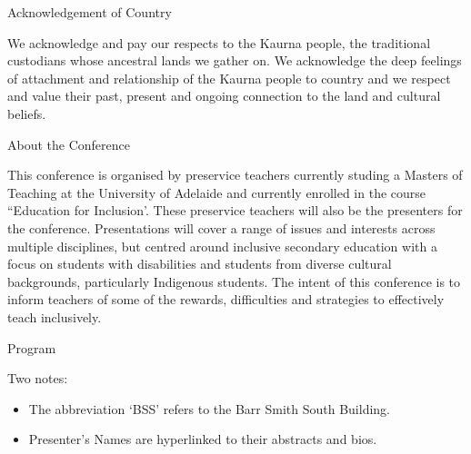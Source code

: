 \documentclass[twoside,14pt,a4paper,notitlepage]{memoir}
\newcounter{chapternonum}
\begin{document}
\pagestyle{plain}



\setcounter{tocdepth}{2}
\tableofcontents
\vfill

\clearpage{}
\vspace*{2cm}
{\Huge Acknowledgement of Country}
\vspace{2cm}

We acknowledge and pay our respects to the Kaurna people, the traditional custodians whose ancestral lands we gather on. We acknowledge the deep feelings of attachment and relationship of the Kaurna people to country and we respect and value their past, present and ongoing connection to the land and cultural beliefs.
\vfill

\clearpage{}
\vspace*{2cm}
{\Huge About the Conference}
\vspace{2cm}

This conference is organised by preservice teachers currently studing a Masters of Teaching at the University of Adelaide and currently enrolled in the course ``Education for Inclusion'. These preservice teachers will also be the presenters for the conference. Presentations will cover a range of issues and interests across multiple disciplines, but centred around inclusive secondary education with a focus on students with disabilities and students from diverse cultural backgrounds, particularly Indigenous students. The intent of this conference is to inform teachers of some of the rewards, difficulties and strategies to effectively teach inclusively. 
\vfill




%

\clearpage{}
\vspace*{2cm}
{\Huge Program}
\vspace{2cm}

Two notes:
\begin{itemize}
	\item The abbreviation `BSS' refers to the Barr Smith South Building.
	\item Presenter's Names are hyperlinked to their abstracts and bios.
\end{itemize}
\end{document}

